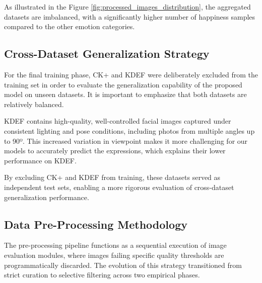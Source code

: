 As illustrated in the Figure \ref{fig:processed_images_distribution}, the aggregated datasets are imbalanced, with a significantly higher number of happiness samples compared to the other emotion categories.

\subsection{Cross-Dataset Generalization Strategy}

For the final training phase, CK+ and KDEF \cite{kdef} were deliberately excluded from the training set in order to evaluate the generalization capability of the proposed model on unseen datasets. It is important to emphasize that both datasets are relatively balanced.

KDEF contains high-quality, well-controlled facial images captured under consistent lighting and pose conditions, including photos from multiple angles up to 90º. This increased variation in viewpoint makes it more challenging for our models to accurately predict the expressions, which explains their lower performance on KDEF.

By excluding CK+ and KDEF from training, these datasets served as independent test sets, enabling a more rigorous evaluation of cross-dataset generalization performance.

\subsection{Data Pre-Processing Methodology}
The pre-processing pipeline functions as a sequential execution of image evaluation modules, where images failing specific quality thresholds are programmatically discarded. The evolution of this strategy transitioned from strict curation to selective filtering across two empirical phases.

